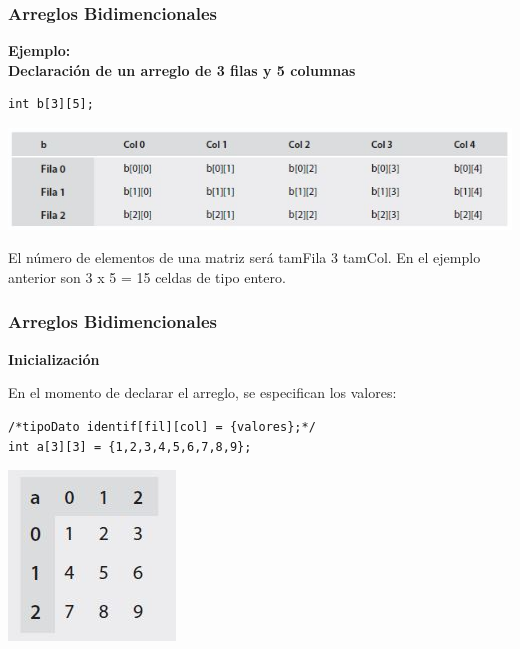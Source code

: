 \begin{frame}[fragile]
    \frametitle{Arreglos Bidimencionales}
    \begin{center}
        \textbf{Ejemplo:\\Declaración de un arreglo de 3 filas y 5 columnas}
    \end{center}
    \begin{lstlisting}
int b[3][5];
\end{lstlisting}
\vspace{-10mm}
\begin{center}
    \includegraphics[scale=0.65]{figs/ejemploArregloBidimencional}
\end{center}
\vspace{-6mm}
El número de elementos de una matriz será tamFila 3 tamCol. En el ejemplo anterior son 3 x 5 = 15 celdas de tipo entero.
\end{frame}


\begin{frame}[fragile]
    \frametitle{Arreglos Bidimencionales}
    \begin{center}
        \textbf{Inicialización}
    \end{center}
    \vspace{-5mm}
    En el momento de declarar el arreglo, se especifican los valores:
    \begin{lstlisting}
/*tipoDato identif[fil][col] = {valores};*/
int a[3][3] = {1,2,3,4,5,6,7,8,9};
    \end{lstlisting}
    \vspace{-5mm}
    \begin{center}
        \includegraphics[scale=0.6]{figs/ejemploVisualMatriz}
    \end{center}
\end{frame}

